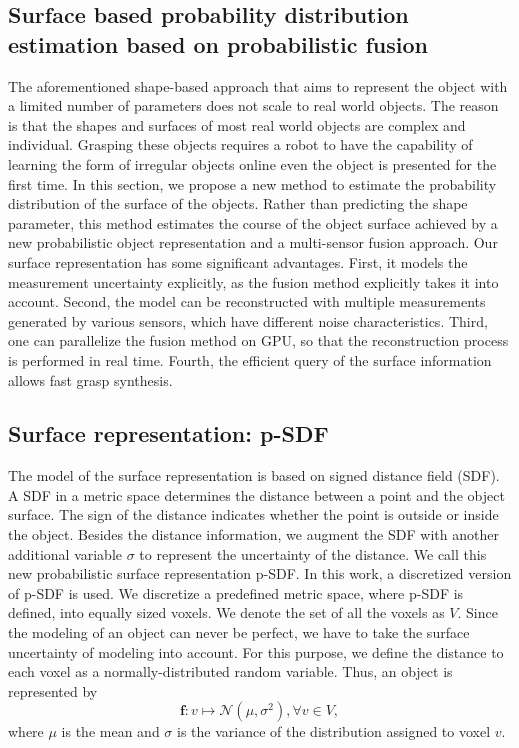 \subsection{Surface based probability distribution estimation based on probabilistic fusion}
The aforementioned shape-based approach that aims to represent the object with a limited number of parameters does not scale to real world objects. The reason is that the shapes and surfaces of most real world objects are complex and individual. Grasping these objects requires a robot to have the capability of learning the form of irregular objects online even the object is presented for the first time. In this section, we propose a new method to estimate the probability distribution of the surface of the objects. Rather than predicting the shape parameter, this method estimates the course of the object surface achieved by a new probabilistic object representation and a multi-sensor fusion approach. Our surface representation has some significant advantages. First, it models the measurement uncertainty explicitly, as the fusion method explicitly takes it into account. Second, the model can be reconstructed with multiple measurements generated by various sensors, which have different noise characteristics. Third, one can parallelize the fusion method on GPU, so that the reconstruction process is performed in real time. Fourth, the efficient query of the surface information allows fast grasp synthesis.

\subsection{Surface representation: p-SDF}
The model of the surface representation is based on signed distance field (SDF). A SDF in a metric space determines the distance between a point and the object surface. The sign of the distance indicates whether the point is outside or inside the object. Besides the distance information, we augment the SDF with another additional variable $\sigma$ to represent the uncertainty of the distance. We call this new probabilistic surface representation p-SDF. In this work, a discretized version of p-SDF is used. We discretize a predefined metric space, where p-SDF is defined, into equally sized voxels. We denote the set of all the voxels as $V$. Since the modeling of an object can never be perfect, we have to take the surface uncertainty of modeling into account. For this purpose, we define the distance to each voxel as a normally-distributed random variable. Thus, an object is represented by  
\begin{equation}
\bm{f}: v \mapsto \mathcal{N}(\mu, \sigma^2),  \forall v \in  V ,
\end{equation}
where $\mu$ is the mean and $\sigma$ is the variance of the distribution assigned to voxel $v$.  

